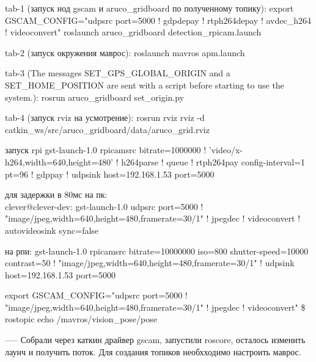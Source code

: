 


tab-1 (запуск нод gscam и aruco\_gridboard по полученному топику): 
export GSCAM\_CONFIG="udpsrc port=5000 ! gdpdepay ! rtph264depay ! avdec\_h264 ! videoconvert"
roslaunch aruco\_gridboard detection\_rpicam.launch

tab-2 (запуск окружения маврос): roslaunch mavros apm.launch

tab-3 (The messages SET\_GPS\_GLOBAL\_ORIGIN and a SET\_HOME\_POSITION are sent with a script before starting to use the system.): rosrun aruco\_gridboard set\_origin.py

tab-4 (запуск rviz на усмотрение): rosrun rviz rviz -d catkin\_ws/src/aruco\_gridboard/data/aruco\_grid.rviz

запуск rpi
gst-launch-1.0 rpicamsrc bitrate=1000000 ! 'video/x-h264,width=640,height=480' ! h264parse ! queue ! rtph264pay config-interval=1 pt=96 ! gdppay ! udpsink host=192.168.1.53 port=5000

для задержки в 80мс на пк:\\
clever@clever-dev: gst-launch-1.0 udpsrc port=5000 ! "image/jpeg,width=640,height=480,framerate=30/1" ! jpegdec ! videoconvert ! autovideosink sync=false

на рпи:
gst-launch-1.0 rpicamsrc bitrate=10000000 iso=800 shutter-speed=10000 contrast=50 ! "image/jpeg,width=640,height=480,framerate=30/1" ! udpsink host=192.168.1.53 port=5000

export GSCAM\_CONFIG="udpsrc port=5000 ! "image/jpeg,width=640,height=480,framerate=30/1" ! jpegdec ! videoconvert"
\$ rostopic echo /mavros/vision\_pose/pose

-----
Собрали через каткин драйвер gscam, запустили roscore, осталось изменить лаунч и получить поток.
Для создания топиков необхходимо настроить маврос.

